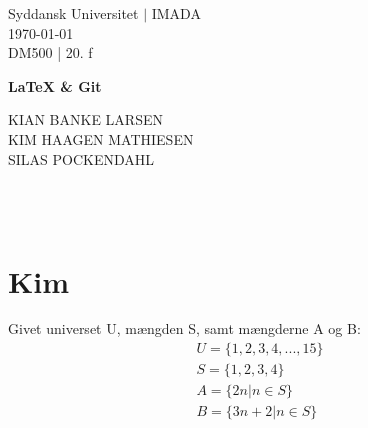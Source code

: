 \documentclass[12pt, a4paper]{article}
\begin{document}
\begin{titlepage}
\begin{centering}
\large Syddansk Universitet $|$ IMADA \\
\today \\
DM500 | 20. f\\

\vspace{4CM}

\huge{\bf \LaTeX{} \& Git } \\

\vspace{\fill}

\fontsize{14}{19.2} {
    \selectfont
    KIAN BANKE LARSEN \vspace{5pt} \\
    KIM HAAGEN MATHIESEN \vspace{5pt} \\
    SILAS POCKENDAHL \vspace{5pt} \\
    \quad
} \\

\vspace{\fill}

\\\vspace{.55cm} %

\end{centering}

\thispagestyle{empty}
\end{titlepage}

\section{Kim}
Givet universet U, mængden S, samt mængderne A og B: \\
    \begin{gather*}
    U = \{1, 2, 3, 4, ..., 15\} \\ 
        S = \{1, 2, 3, 4\}\\
        A = \{ 2n | n \in S \}\\
        B = \{ 3n+2 | n \in S \}
    \end{gather*}
         
\end{document}
